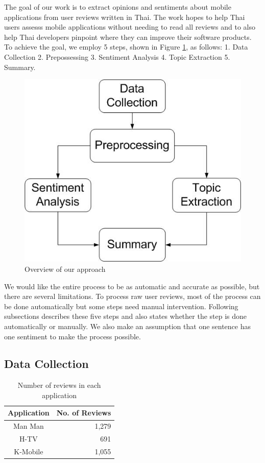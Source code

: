 
The goal of our work is to extract opinions and sentiments about mobile applications from user reviews written in Thai. The work hopes to help Thai users assesss mobile applications without needing to read all reviews and to also help Thai developers pinpoint where they can improve their software products. To achieve the goal, we employ 5 steps, shown in Figure \ref{fig:approachFig}, as follows: 1. Data Collection 2. Prepossessing 3. Sentiment Analysis 4. Topic Extraction 5. Summary. 

\begin{figure}[h]
	\centering
	\includegraphics[width=.5\linewidth]{Process.jpg}
	\caption{Overview of our approach}
	\label{fig:approachFig}
\end{figure}

We would like the entire process to be as automatic and accurate as possible, but there are several limitations. To process raw user reviews, most of the process can be done automatically but some steps need manual intervention. Following subsections describes these five steps and also states whether the step is done automatically or manually. We also make an assumption that one sentence has one sentiment to make the process possible. 

\subsection{Data Collection}

\begin{table}[h]
	\caption{Number of reviews in each application}
	\label{table:NoOfReview}
	\centering
	\begin{tabular}{|c|r|}
		\hline
		\textbf{Application} & \multicolumn{1}{|c|}{\textbf{No. of Reviews}} \\
		\hline
		Man Man & 1,279\\
		\hline
		H-TV & 691\\
		\hline
		K-Mobile & 1,055\\
		\hline
	\end{tabular}
\end{table}

